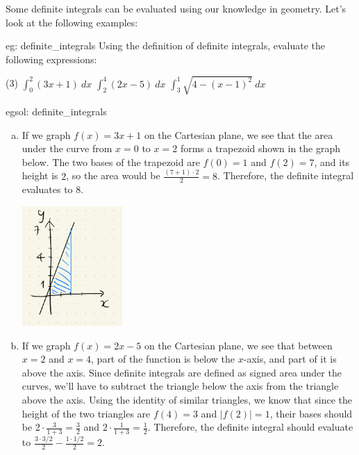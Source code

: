 Some definite integrals can be evaluated using our knowledge in geometry.  Let's look at the following examples:

\begin{eg}[]{eg: definite_integrals}
    Using the definition of definite integrals, evaluate the following expressions:
    \begin{tasks}(3)
        \task $\int_0^2 (3x+1)~dx$
        \task $\int_2^4 (2x-5)~dx$
        \task $\int_3^1 \sqrt{4-(x-1)^2}~dx$
    \end{tasks}
\end{eg}

\begin{egsol}[]{egsol: definite_integrals}
    \begin{enumerate}[a)]
        \item If we graph $f(x) = 3x+1$ on the Cartesian plane, we see that the area under the curve from $x=0$ to $x=2$ forms a trapezoid shown in the graph below.  The two bases of the trapezoid are $f(0) = 1$ and $f(2) = 7$, and its height is $2$, so the area would be $\frac{(7+1)\cdot 2}{2} = 8$.  Therefore, the definite integral evaluates to $8$.

        \medskip
        \begin{center}
            \includegraphics[width = 0.3\textwidth]{figures/chap 07/def_int_a.png}
        \end{center}
        \item If we graph $f(x) = 2x-5$ on the Cartesian plane, we see that between $x = 2$ and $x = 4$, part of the function is below the $x$-axis, and part of it is above the axis.  Since definite integrals are defined as signed area under the curves, we'll have to subtract the triangle below the axis from the triangle above the axis.  Using the identity of similar triangles, we know that since the height of the two triangles are $f(4) = 3$ and $|f(2)|=1$, their bases should be $2\cdot\frac{3}{1+3} = \frac{3}{2}$ and $2\cdot\frac{1}{1+3} = \frac{1}{2}$.  Therefore, the definite integral should evaluate to $\frac{3\cdot3/2}{2}-\frac{1\cdot1/2}{2} = 2$.
        

\end{enumerate}
\end{egsol}
